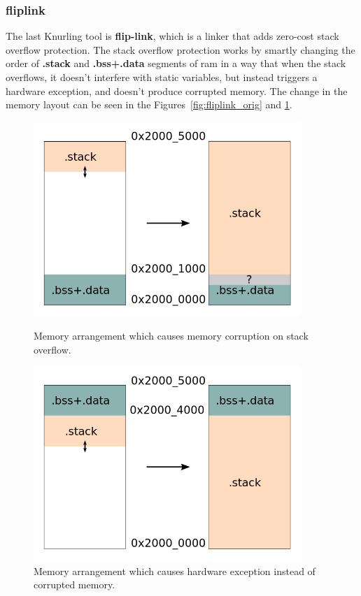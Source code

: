 \subsubsection{flip\textendash link}
The last Knurling tool is \textbf{flip-link}, which is a linker that adds zero-cost stack overflow protection\cite{knurling_project_knurling-rsflip-link_2021}.
The stack overflow protection works by smartly changing the order of \textbf{.stack} and \textbf{.bss+.data} segments of \acs{ram} in a way that when the stack overflows, it doesn't interfere with static variables, but instead triggers a hardware exception, and doesn't produce corrupted memory.
The change in the memory layout can be seen in the Figures~\ref{fig:fliplink_orig} and \ref{fig:fliplink_changed}.
\begin{figure}[H]
    \begin{minipage}[t]{0.45\textwidth}
        \centering
        \includegraphics[width=0.9\textwidth]{obrazky/flip_overflow}
        \caption{Memory arrangement which causes memory corruption on stack overflow\cite{knurling_project_knurling-rsflip-link_2021}.}
        \label{fig:fliplink_orig}
    \end{minipage}\hfill
    \begin{minipage}[t]{0.45\textwidth}
        \centering
        \includegraphics[width=0.9\textwidth]{obrazky/flip_flipped}
        \caption{Memory arrangement which causes hardware exception instead of corrupted memory\cite{knurling_project_knurling-rsflip-link_2021}.}
        \label{fig:fliplink_changed}
    \end{minipage}
\end{figure}

